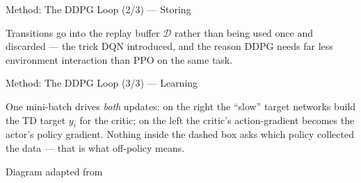 \begin{frame}{Method: The DDPG Loop (2/3) --- Storing}
\vspace{0.2em}
\centering
{}

\vspace{0.5em}
\begin{flushleft}\footnotesize
Transitions go into the replay buffer $\mathcal{D}$ rather than being used once and discarded --- the trick DQN introduced, and the reason DDPG needs far less environment interaction than PPO on the same task.
\end{flushleft}
\end{frame}

\begin{frame}{Method: The DDPG Loop (3/3) --- Learning}
\vspace{0.2em}
\centering
{}

\vspace{0.3em}
\begin{flushleft}\footnotesize
One mini-batch drives \emph{both} updates: on the right the ``slow'' target networks build the TD target $y_i$ for the critic; on the left the critic's action-gradient becomes the actor's policy gradient. Nothing inside the dashed box asks which policy collected the data --- that is what off-policy means.
\end{flushleft}
\vspace{-0.4em}
\begin{flushright}\tiny Diagram adapted from \end{flushright}
\end{frame}

%
\newcommand{\hlif}[3]{\ifnum#1=#2 \hlbox{red}{#3}\else\hlbox{none}{#3}\fi}

